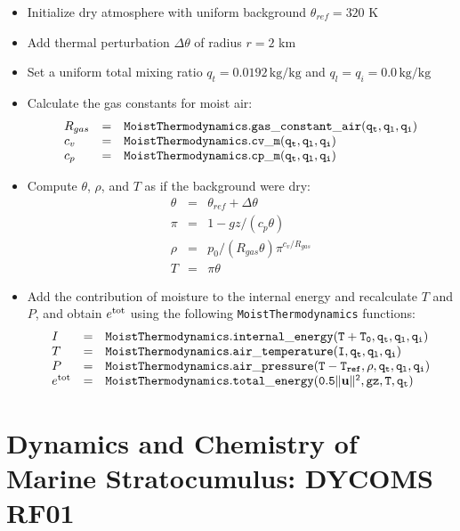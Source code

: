 \documentclass{report}
\begin{document}
\begin{itemize}
\item Initialize dry atmosphere with uniform background $\theta_{ref} = 320$ K
\item Add thermal perturbation $\Delta \theta$ of radius $r=2$ km
\item Set a uniform total mixing ratio $q_t = 0.0192 \,\mathrm{kg/kg}$ and $q_l = q_i = 0.0\,\mathrm{kg/kg}$
\item Calculate the gas constants for moist air: 
\[\begin{array}{lcl}
R_{gas} &=& {\tt MoistThermodynamics.gas\_constant\_air(q_t, q_l, q_i)}\\
c_v     &=& {\tt MoistThermodynamics.cv\_m(q_t, q_l, q_i)}\\
c_p     &=& {\tt MoistThermodynamics.cp\_m(q_t, q_l, q_i)}\\
\end{array}
\]
\item  Compute $\theta$, $\rho$, and $T$ as if the background were dry:\\
    \[ \begin{array}{lcl}
  \theta &=& \theta_{ref} + \Delta\theta\\
 \pi & =& 1 - gz/(c_p\theta)\\
 \rho & = & p_0/(R_{gas}\theta)\pi^{c_v/R_{gas}}\\
 T   & = &\pi \theta
\end{array}\]

\item Add the contribution of moisture to the internal energy and recalculate $T$ and $P$, and obtain $e^{\rm tot}$ using the following {\tt MoistThermodynamics} functions:
\[\begin{array}{lcl}
I &=& {\tt MoistThermodynamics.internal\_energy(T + T_0, q_t, q_l, q_i)}\\
T &=& {\tt MoistThermodynamics.air\_temperature(I, q_t, q_l, q_i)}\\
P &=& {\tt MoistThermodynamics.air\_pressure(T - T_{ref} , \rho, q_t, q_l, q_i)}\\
e^{\rm tot} &=& {\tt MoistThermodynamics.total\_energy(0.5\|{\bf u} \|^2, gz, T, q_t)}
\end{array}\]
\end{itemize}

\section{Dynamics and Chemistry of Marine Stratocumulus: DYCOMS RF01}
\end{document}
